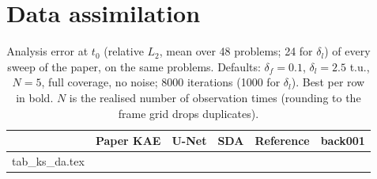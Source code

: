 \documentclass[10pt]{article}
\begin{document}
\section*{Data assimilation}
\begin{table}[!htbp]
\centering\scriptsize
\caption{Analysis error at $t_0$ (relative $L_2$, mean over 48 problems; 24 for $\delta_l$) of
every sweep of the paper, on the same problems. Defaults: $\delta_f = 0.1$, $\delta_l = 2.5$
t.u., $N = 5$, full coverage, no noise; 8000 iterations (1000 for $\delta_l$). Best per row in
bold. $N$ is the realised number of observation times (rounding to the frame grid drops
duplicates).}
\label{tab:ksda}
\begin{tabular}{lccccc}
\toprule
 & Paper KAE & U-Net & SDA & Reference & back001\\
\midrule
{} tab_ks_da.tex
\bottomrule
\end{tabular}
\end{table}
\end{document}
